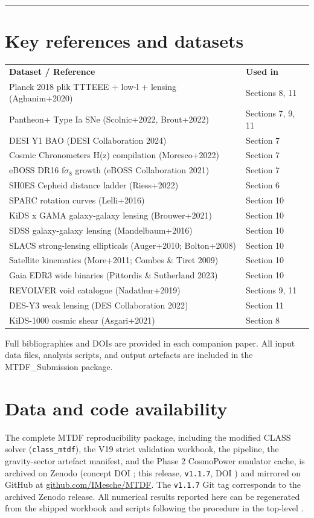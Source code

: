 \documentclass[11pt,a4paper]{article}
\begin{document}
\noindent\rule{\linewidth}{0.4pt}\par

\section{Key references and datasets}
\label{sec:refs}
\begingroup\scriptsize
\begin{xltabular}{\linewidth}{>{\RaggedRight\arraybackslash}X>{\RaggedRight\arraybackslash}X}
\toprule
\endfirsthead
\toprule\endhead
\bottomrule\endfoot
\textbf{Dataset / Reference} & \textbf{Used in} \tabularnewline
Planck 2018 plik TTTEEE + low-l + lensing (Aghanim+2020) & Sections 8, 11 \tabularnewline
Pantheon+ Type Ia SNe (Scolnic+2022, Brout+2022) & Sections 7, 9, 11 \tabularnewline
DESI Y1 BAO (DESI Collaboration 2024) & Section 7 \tabularnewline
Cosmic Chronometers H(z) compilation (Moresco+2022) & Section 7 \tabularnewline
eBOSS DR16 f$\sigma_8$ growth (eBOSS Collaboration 2021) & Section 7 \tabularnewline
SH0ES Cepheid distance ladder (Riess+2022) & Section 6 \tabularnewline
SPARC rotation curves (Lelli+2016) & Section 10 \tabularnewline
KiDS x GAMA galaxy-galaxy lensing (Brouwer+2021) & Section 10 \tabularnewline
SDSS galaxy-galaxy lensing (Mandelbaum+2016) & Section 10 \tabularnewline
SLACS strong-lensing ellipticals (Auger+2010; Bolton+2008) & Section 10 \tabularnewline
Satellite kinematics (More+2011; Combes \& Tiret 2009) & Section 10 \tabularnewline
Gaia EDR3 wide binaries (Pittordis \& Sutherland 2023) & Section 10 \tabularnewline
REVOLVER void catalogue (Nadathur+2019) & Sections 9, 11 \tabularnewline
DES-Y3 weak lensing (DES Collaboration 2022) & Section 11 \tabularnewline
KiDS-1000 cosmic shear (Asgari+2021) & Section 8 \tabularnewline
\end{xltabular}
\endgroup

Full bibliographies and DOIs are provided in each companion paper. All input data files, analysis scripts, and output artefacts are included in the MTDF\_\allowbreak{}Submission package.

\section{Data and code availability}
The complete MTDF reproducibility package, including the modified CLASS solver
(\texttt{class\_\allowbreak{}mtdf}), the V19 strict validation workbook, the
\texttt{{\small\protect{}}} pipeline, the gravity-sector artefact manifest,
and the Phase 2 CosmoPower emulator cache, is archived on Zenodo
(concept DOI \href{https://doi.org/10.5281/zenodo.19741058}{{\small\protect{}}};
this release, \texttt{v1.1.7}, DOI
\href{https://doi.org/10.5281/zenodo.21525855}{{\small\protect{}}})
and mirrored on GitHub at
\href{https://github.com/IMesche/MTDF}{github.com/\allowbreak{}IMesche/\allowbreak{}MTDF}.
The \texttt{v1.1.7} Git tag corresponds to the archived Zenodo release. All
numerical results reported here can be regenerated from the shipped workbook
and scripts following the procedure in the top-level \texttt{{\small\protect{}}}.
\end{document}
